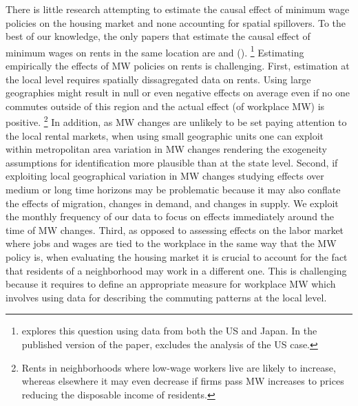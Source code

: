 
There is little research attempting to estimate the causal effect of minimum wage 
policies on the housing market and none accounting for spatial spillovers.
To the best of our knowledge, the only papers that estimate the causal effect of 
minimum wages on rents in the same location are \textcite{Tidemann2018} and 
\citeauthor{Yamagishi2019} (\citeyear{Yamagishi2019, Yamagishi2021}).%
\footnote{\textcite{Yamagishi2019} explores this question using data from both the
US and Japan. In the published version of the paper, \textcite{Yamagishi2021} 
excludes the analysis of the US case.}
Estimating empirically the effects of MW policies on rents is challenging. 
First, estimation at the local level requires spatially dissagregated data on rents.
Using large geographies might result in null or even negative effects on average
even if no one commutes outside of this region and the actual effect (of workplace
MW) is positive.%
\footnote{Rents in neighborhoods where low-wage workers live 
	are likely to increase, whereas elsewhere it may even decrease if firms
	pass MW increases to prices reducing the disposable income of residents.} 
In addition, as MW changes are unlikely to be set paying attention to the local
rental markets, when using small geographic units one can exploit within metropolitan area 
variation in MW changes rendering the exogeneity assumptions for identification more plausible
than at the state level.
Second, if exploiting local geographical variation in MW changes studying effects over 
medium or long time horizons may be problematic because it may also conflate the effects of 
migration, changes in demand, and changes in supply. We exploit the monthly frequency of 
our data to focus on effects immediately around the time of MW changes. 
Third, as opposed to assessing effects on the labor market where jobs and wages are tied to 
the workplace in the same way that the MW policy is, when evaluating the housing market it 
is crucial to account for the fact that residents of a neighborhood may work in a different one. 
This is challenging because it requires to define an appropriate measure for workplace MW which 
involves using data for describing the commuting patterns at the local level.



